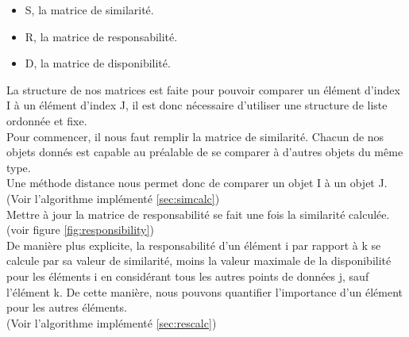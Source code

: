 \begin{appendix}
\begin{itemize}
    \item S, la matrice de similarité.
    \item R, la matrice de responsabilité.
    \item D, la matrice de disponibilité.
\end{itemize}
    \hspace*{13px} La structure de nos matrices est faite pour pouvoir comparer un élément d'index I à un élément d'index J, il est donc nécessaire d'utiliser une structure de liste ordonnée et fixe.\\
    Pour commencer, il nous faut remplir la matrice de similarité.
    Chacun de nos objets donnés est capable au préalable de se comparer à d'autres objets du même type.\\
    Une méthode distance nous permet donc de comparer un objet I à un objet J. \\ 
    (Voir l'algorithme implémenté \ref{sec:simcalc})\\

    Mettre à jour la matrice de responsabilité se fait une fois la similarité calculée. (voir figure \ref{fig:responsibility})\\
    De manière plus explicite, la responsabilité d'un élément i par rapport à k se calcule par sa valeur de similarité, moins la valeur maximale de la disponibilité pour les éléments i en considérant tous les autres points de données j, sauf l'élément k. De cette manière, nous pouvons quantifier l'importance d'un élément pour les autres éléments.\\
    (Voir l'algorithme implémenté \ref{sec:rescalc})\\
    

\end{appendix}
